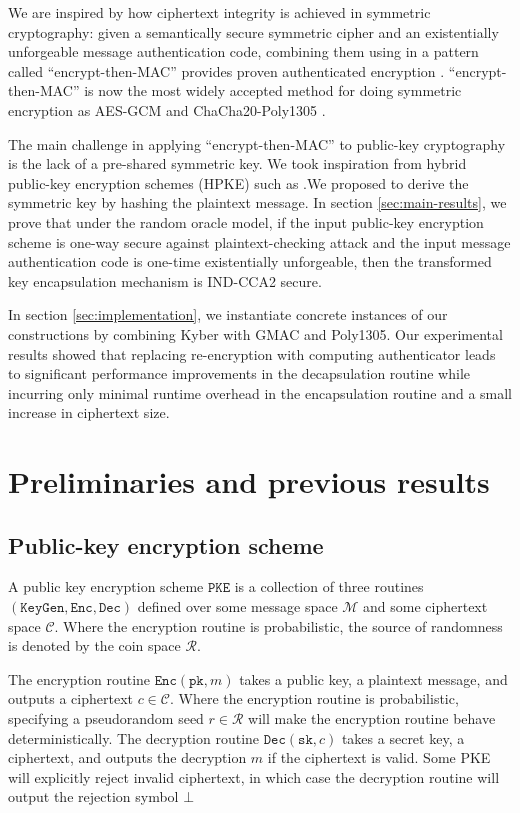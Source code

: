\documentclass[floatrow,journal=tches,submission]{iacrtrans}
\newcommand{\pke}{\texttt{PKE}}
\newcommand{\keygen}{\texttt{KeyGen}}
\newcommand{\encrypt}{\texttt{Enc}}
\newcommand{\decrypt}{\texttt{Dec}}
\newcommand{\pk}{\texttt{pk}}
\newcommand{\sk}{\texttt{sk}}
\begin{document}
We are inspired by how ciphertext integrity is achieved in symmetric cryptography: given a semantically secure symmetric cipher and an existentially unforgeable message authentication code, combining them using in a pattern called ``encrypt-then-MAC'' provides proven authenticated encryption \cite{bellare2000authenticated}. ``encrypt-then-MAC'' is now the most widely accepted method for doing symmetric encryption as AES-GCM \cite{mcgrew2004galois} and ChaCha20-Poly1305 \cite{nir2018chacha20}.

The main challenge in applying ``encrypt-then-MAC'' to public-key cryptography is the lack of a pre-shared symmetric key. We took inspiration from hybrid public-key encryption schemes (HPKE) such as .We proposed to derive the symmetric key by hashing the plaintext message. In section \ref{sec:main-results}, we prove that under the random oracle model, if the input public-key encryption scheme is one-way secure against plaintext-checking attack and the input message authentication code is one-time existentially unforgeable, then the transformed key encapsulation mechanism is IND-CCA2 secure.

In section \ref{sec:implementation}, we instantiate concrete instances of our constructions by combining Kyber with GMAC and Poly1305. Our experimental results showed that replacing re-encryption with computing authenticator leads to significant performance improvements in the decapsulation routine while incurring only minimal runtime overhead in the encapsulation routine and a small increase in ciphertext size.

\section{Preliminaries and previous results}

\subsection{Public-key encryption scheme}
A public key encryption scheme $\pke$ is a collection of three routines $(\keygen, \encrypt, \decrypt)$ defined over some message space $\mathcal{M}$ and some ciphertext space $\mathcal{C}$. Where the encryption routine is probabilistic, the source of randomness is denoted by the coin space $\mathcal{R}$.

The encryption routine $\encrypt(\pk, m)$ takes a public key, a plaintext message, and outputs a ciphertext $c \in \mathcal{C}$. Where the encryption routine is probabilistic, specifying a pseudorandom seed $r \in \mathcal{R}$ will make the encryption routine behave deterministically. The decryption routine $\decrypt(\sk, c)$ takes a secret key, a ciphertext, and outputs the decryption $\hat{m}$ if the ciphertext is valid. Some PKE will explicitly reject invalid ciphertext, in which case the decryption routine will output the rejection symbol $\bot$
\end{document}
